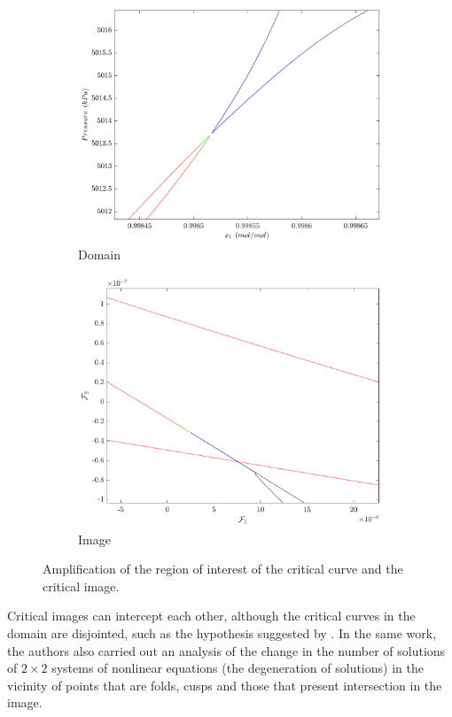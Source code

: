 \documentclass[journal=iecred,manuscript=article]{achemso}
\theoremstyle{definition}
\theoremstyle{remark}
\begin{document}
\begin{figure}
\centering
\begin{subfigure}{.5\textwidth}
  \centering
  \includegraphics[width=.9\linewidth]{bicos_dominio}
  \caption{Domain}
  \label{fig:sub1}
\end{subfigure}%
\begin{subfigure}{.5\textwidth}
  \centering
  \includegraphics[width=.9\linewidth]{bicos_imagem}
  \caption{Image}
  \label{fig:sub2}
\end{subfigure}
\caption{Amplification of the region of interest of the critical curve and the critical image.}
\label{fig:domain_image}
\end{figure}

Critical images can intercept each other, although the critical curves in the domain are disjointed, such as the hypothesis suggested by \citet{malta}. In the same work, the authors also carried out an analysis of the change in the number of solutions of $ 2 \times 2 $ systems of nonlinear equations (the degeneration of solutions) in the vicinity of points that are folds, cusps and those that present intersection in the image.
\end{document}

